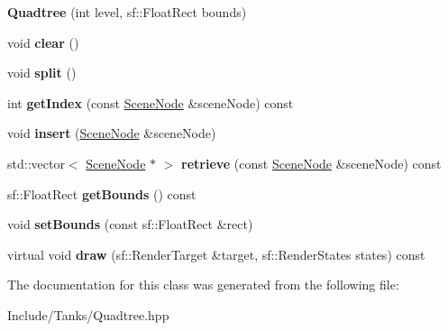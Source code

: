 \begin{DoxyCompactItemize}
\item 
\hypertarget{class_quadtree_a5c7b5645185e1994f6f8ae25eac9cbdd}{}{\bfseries Quadtree} (int level, sf\+::\+Float\+Rect bounds)\label{class_quadtree_a5c7b5645185e1994f6f8ae25eac9cbdd}

\item 
\hypertarget{class_quadtree_ab2b40ef82fa81688886c8f38bf7846d3}{}void {\bfseries clear} ()\label{class_quadtree_ab2b40ef82fa81688886c8f38bf7846d3}

\item 
\hypertarget{class_quadtree_a496a472afe2ebe39478ab089d4a3526a}{}void {\bfseries split} ()\label{class_quadtree_a496a472afe2ebe39478ab089d4a3526a}

\item 
\hypertarget{class_quadtree_a823eb501b292b4cce84fc5e779890027}{}int {\bfseries get\+Index} (const \hyperlink{class_scene_node}{Scene\+Node} \&scene\+Node) const \label{class_quadtree_a823eb501b292b4cce84fc5e779890027}

\item 
\hypertarget{class_quadtree_a7559d12bb7cb05c6e5c8ddddcbc1ec03}{}void {\bfseries insert} (\hyperlink{class_scene_node}{Scene\+Node} \&scene\+Node)\label{class_quadtree_a7559d12bb7cb05c6e5c8ddddcbc1ec03}

\item 
\hypertarget{class_quadtree_af1712ccec2952bfaf379c854b798eb47}{}std\+::vector$<$ \hyperlink{class_scene_node}{Scene\+Node} $\ast$ $>$ {\bfseries retrieve} (const \hyperlink{class_scene_node}{Scene\+Node} \&scene\+Node) const \label{class_quadtree_af1712ccec2952bfaf379c854b798eb47}

\item 
\hypertarget{class_quadtree_ad3956dc1f458ecd92be053465453dd57}{}sf\+::\+Float\+Rect {\bfseries get\+Bounds} () const \label{class_quadtree_ad3956dc1f458ecd92be053465453dd57}

\item 
\hypertarget{class_quadtree_a29c7e64da9ebbbf3c093c6d437e2f8e4}{}void {\bfseries set\+Bounds} (const sf\+::\+Float\+Rect \&rect)\label{class_quadtree_a29c7e64da9ebbbf3c093c6d437e2f8e4}

\item 
\hypertarget{class_quadtree_ad94ee55aa6e1d48aa3ab4958443d0b2f}{}virtual void {\bfseries draw} (sf\+::\+Render\+Target \&target, sf\+::\+Render\+States states) const \label{class_quadtree_ad94ee55aa6e1d48aa3ab4958443d0b2f}

\end{DoxyCompactItemize}


The documentation for this class was generated from the following file\+:\begin{DoxyCompactItemize}
\item 
Include/\+Tanks/Quadtree.\+hpp\end{DoxyCompactItemize}
